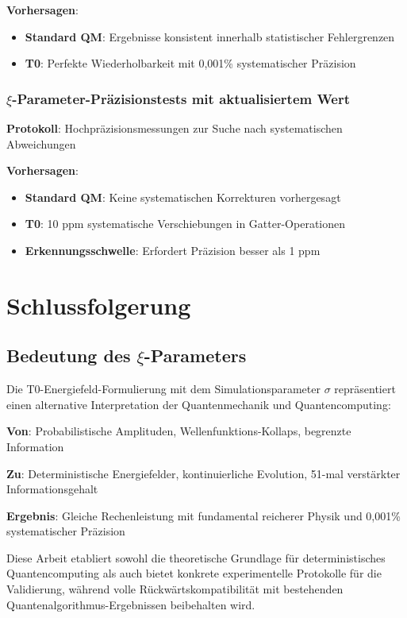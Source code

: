 	\textbf{Vorhersagen}:
	\begin{itemize}
		\item \textbf{Standard QM}: Ergebnisse konsistent innerhalb statistischer Fehlergrenzen
		\item \textbf{T0}: Perfekte Wiederholbarkeit mit 0,001\% systematischer Präzision
	\end{itemize}
	
	\subsubsection{$\xi$-Parameter-Präzisionstests mit aktualisiertem Wert}
	
	\textbf{Protokoll}: Hochpräzisionsmessungen zur Suche nach systematischen Abweichungen
	
	\textbf{Vorhersagen}:
	\begin{itemize}
		\item \textbf{Standard QM}: Keine systematischen Korrekturen vorhergesagt
		\item \textbf{T0}: 10 ppm systematische Verschiebungen in Gatter-Operationen
		\item \textbf{Erkennungsschwelle}: Erfordert Präzision besser als 1 ppm
	\end{itemize}
	
	\section{Schlussfolgerung}
	
	\subsection{Bedeutung des $\xi$-Parameters}
	
	\begin{tcolorbox}[colback=red!5!white,colframe=red!75!black,title=Zusammenfassung der T0-Interpretation]
		Die T0-Energiefeld-Formulierung mit dem Simulationsparameter $\sigma$ repräsentiert einen alternative Interpretation der Quantenmechanik und Quantencomputing:
		
		\textbf{Von}: Probabilistische Amplituden, Wellenfunktions-Kollaps, begrenzte Information
		
		\textbf{Zu}: Deterministische Energiefelder, kontinuierliche Evolution, 51-mal verstärkter Informationsgehalt
		
		\textbf{Ergebnis}: Gleiche Rechenleistung mit fundamental reicherer Physik und 0,001\% systematischer Präzision
		
		Diese Arbeit etabliert sowohl die theoretische Grundlage für deterministisches Quantencomputing als auch bietet konkrete experimentelle Protokolle für die Validierung, während volle Rückwärtskompatibilität mit bestehenden Quantenalgorithmus-Ergebnissen beibehalten wird.
	\end{tcolorbox}
	
